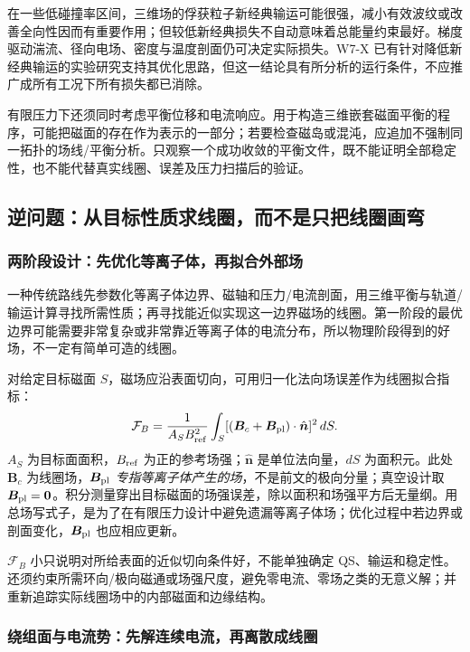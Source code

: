 \documentclass[12pt,fontset=none]{ctexart}
\numberwithin{equation}{section}
\numberwithin{table}{section}
\numberwithin{figure}{section}
\begin{document}
在一些低碰撞率区间，三维场的俘获粒子新经典输运可能很强，减小有效波纹或改善全向性因而有重要作用；但较低新经典损失不自动意味着总能量约束最好。梯度驱动湍流、径向电场、密度与温度剖面仍可决定实际损失。W7-X 已有针对降低新经典输运的实验研究支持其优化思路，但这一结论具有所分析的运行条件，不应推广成所有工况下所有损失都已消除\cite{Sneo}。

有限压力下还须同时考虑平衡位移和电流响应。用于构造三维嵌套磁面平衡的程序，可能把磁面的存在作为表示的一部分；若要检查磁岛或混沌，应追加不强制同一拓扑的场线/平衡分析。只观察一个成功收敛的平衡文件，既不能证明全部稳定性，也不能代替真实线圈、误差及压力扫描后的验证。

\subsection{逆问题：从目标性质求线圈，而不是只把线圈画弯}\label{sec:stellarator-inverse}

\subsubsection{两阶段设计：先优化等离子体，再拟合外部场}

一种传统路线先参数化等离子体边界、磁轴和压力/电流剖面，用三维平衡与轨道/输运计算寻找所需性质；再寻找能近似实现这一边界磁场的线圈。第一阶段的最优边界可能需要非常复杂或非常靠近等离子体的电流分布，所以物理阶段得到的好场，不一定有简单可造的线圈。

对给定目标磁面 $S$，磁场应沿表面切向，可用归一化法向场误差作为线圈拟合指标：
\begin{equation}\label{eq:stellarator-normal}
 \mathcal F_B=\frac1{A_SB_{\rm ref}^2}
 \int_S[(\bm B_c+\bm B_{\rm pl})\cdot\hat{\bm n}]^2\,dS.
\end{equation}
$A_S$ 为目标面面积，$B_{\rm ref}$ 为正的参考场强；$\hat{\bm n}$ 是单位法向量，$dS$ 为面积元。此处 $\bm B_c$ 为线圈场，$\bm B_{\rm pl}$ \emph{专指等离子体产生的场}，不是前文的极向分量；真空设计取 $\bm B_{\rm pl}=\bm0$。积分测量穿出目标磁面的场强误差，除以面积和场强平方后无量纲。用总场写式子，是为了在有限压力设计中避免遗漏等离子体场；优化过程中若边界或剖面变化，$\bm B_{\rm pl}$ 也应相应更新。

$\mathcal F_B$ 小只说明对所给表面的近似切向条件好，不能单独确定 QS、输运和稳定性。还须约束所需环向/极向磁通或场强尺度，避免零电流、零场之类的无意义解；并重新追踪实际线圈场中的内部磁面和边缘结构。

\subsubsection{绕组面与电流势：先解连续电流，再离散成线圈}
\end{document}
